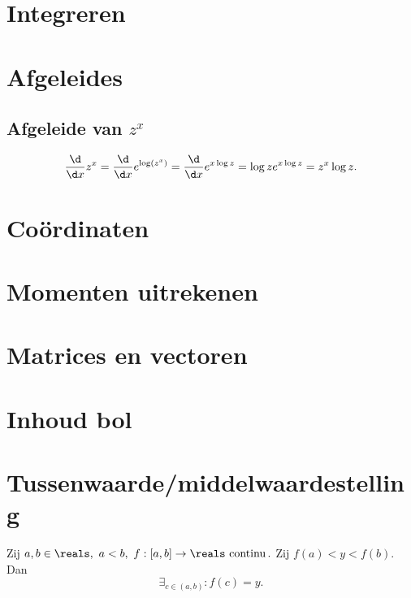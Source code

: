 \documentclass{article}
\begin{document}
    \section{Integreren}\label{sec:integreren}
    

    \section{Afgeleides}\label{sec:afgeleides}
    \subsection{Afgeleide van $z^x$}\label{subsec:afgeleide-van}
    \[
        \frac{\d}{\d x} z^x = \frac{\d}{\d x} e^{\log \left( z^x \right)} = \frac{\d}{\d x} e^{x \log z} = \log z e^{x \log z} = z^x \log z.
    \]

    \section{Co\"ordinaten}\label{sec:coordinaten}
    

    \section{Momenten uitrekenen}\label{sec:momenten-uitrekenen}
    

    \section{Matrices en vectoren}\label{sec:matrices-en-vectoren}
    

    \section{Inhoud bol}\label{sec:inhoudBol}
    

    \section{Tussenwaarde/middelwaardestelling}\label{sec:tussenwaarde/middelwaardestelling}
    \begin{stelling}

        Zij $a,b \in \reals,\ a<b,\
            f:[a,b]\to \reals \text{ continu}\,.
        $
        Zij $f(a)<y<f(b)$.
        Dan \[ \exists_{c\in(a,b)}:f(c)=y. \]
    \end{stelling}
\end{document}
